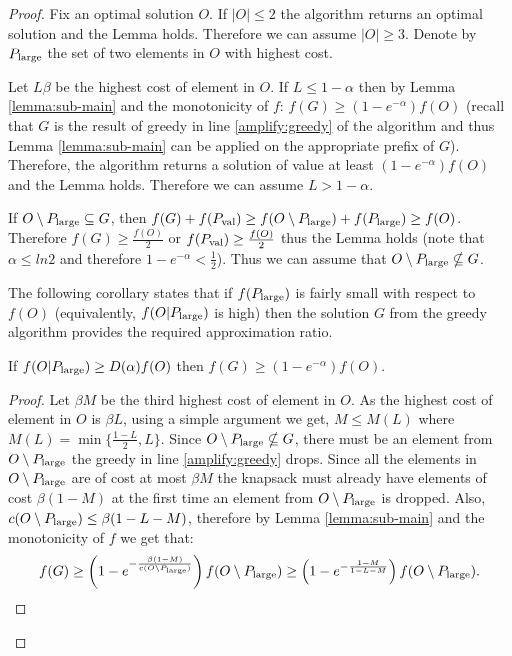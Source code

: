 \begin{proof}

	Fix an optimal solution $O$.
	 If $|O|\leq 2$ the algorithm returns an optimal solution and the Lemma holds.
	Therefore we can assume $|O| \geq 3$.  Denote by $P_{\text{large}}$ the set of  two  elements in $O$ with highest cost.
	
	Let $L\beta$ be the highest cost of element in $O$.  If $L\leq 1-\alpha$ then
	by Lemma \ref{lemma:sub-main} and the monotonicity of $f$: $f(G) \geq (1-e^{-\alpha}) f(O)$  (recall that $G$ is the result of
	greedy in line \ref{amplify:greedy} of the algorithm and thus Lemma \ref{lemma:sub-main} can be applied on the appropriate prefix of $G$). Therefore, the algorithm
	returns a solution of value at least $(1-e^{-\alpha})f(O)$ and the Lemma holds. Therefore we can assume  $L> 1-\alpha$.
%
	
	If $O\setminus P_{\text{large}} \subseteq G$, then
	$f(G)+ f(P_{\text{val}})\geq f(O\setminus P_{\text{large}}) + f(P_{\text{large}}) \geq f(O)$.
	Therefore $f(G)\geq \frac{f(O)}{2}$ or $f(P_{\text{val}})\geq \frac{f(O)}{2}$
	thus the Lemma holds (note that $\alpha \leq ln 2$ and therefore
	$1-e^{-\alpha} < \frac{1}{2}$). Thus we can assume that
	$O\setminus P_{\text{large}} \nsubseteq G$.
	
	The following corollary states that if $f(P_{\text{large}})$ is fairly small
	with respect to $f(O)$ (equivalently, $f(O|P_{\text{large}})$ is high) then the solution $G$ from the greedy algorithm provides
	the required approximation ratio.
	
	\begin{corollary}
		\label{corollary:cor1}
	If $f(O|P_{\text{large}}) \geq D(\alpha) f(O)$ then $f(G)\geq (1-e^{-\alpha})f(O)$.
	\end{corollary}

\begin{proof}
	

	Let $\beta M$ be the third highest cost of element in  $O$.
	As the highest cost of  element in $O$ is $\beta L$,
	using a simple argument we get, $M\leq M(L)$ where $M(L)= \min \{\frac{1-L}{2}, L\}$. Since
	$O\setminus P_{\text{large}} \nsubseteq G$, there must be an element from $O \setminus P_{\text{large}}$ the greedy in line \ref{amplify:greedy} drops. Since all the elements
	in $O\setminus P_{\text{large}}$ are of cost at most $\beta M$ the knapsack must
	already have elements of cost $\beta (1-M)$ at the first time an element from $O\setminus P_{\text{large}}$ is dropped. Also, $c(O\setminus P_{\text{large}}) \leq \beta(1-L -M)$, therefore by Lemma \ref{lemma:sub-main} and the monotonicity of $f$ we get that:
  	$$f(G)\geq \left(1-e^{- \frac{\beta (1-M) }{c(O\setminus P_{\text{large}})}}\right) f(O\setminus P_{\text{large}})
  			\geq \left(1-e^{- \frac{1-M }{1-L-M}}\right) f(O\setminus P_{\text{large}}) .$$
  			

\end{proof}
\end{proof}
